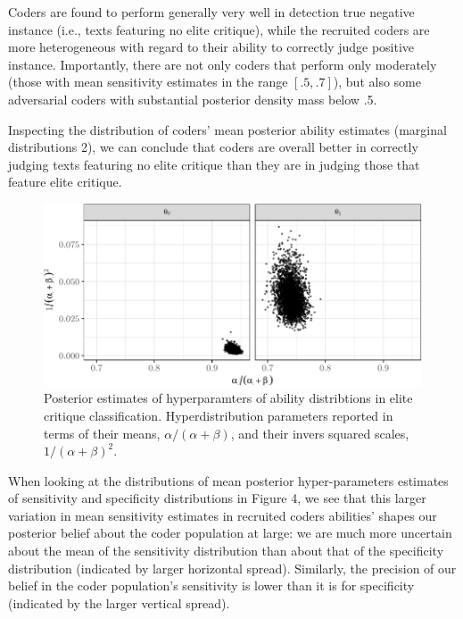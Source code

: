 \documentclass[12pt,]{article}
\begin{document}
Coders are found to perform generally very well in detection true
negative instance (i.e., texts featuring no elite critique), while the
recruited coders are more heterogeneous with regard to their ability to
correctly judge positive instance. Importantly, there are not only
coders that perform only moderately (those with mean sensitivity
estimates in the range \([.5, .7]\)), but also some adversarial coders
with substantial posterior density mass below .5.

Inspecting the distribution of coders' mean posterior ability estimates
(marginal distributions 2), we can conclude that coders are overall
better in correctly judging texts featuring no elite critique than they
are in judging those that feature elite critique.

\begin{figure}[H]

{\centering \includegraphics{licht_2019_evaluating_crowdsourced_elite_critique_codings_files/figure-latex/inspect_hyperpars_anti-elitism-1} 

}

\caption{Posterior estimates of hyperparamters of ability distribtions in elite critique classification. Hyperdistribution parameters reported in terms of their means, $\alpha/(\alpha+\beta)$, and their invers squared scales, $1/(\alpha+\beta)^2$.}\label{fig:inspect_hyperpars_anti-elitism}
\end{figure}

When looking at the distributions of mean posterior hyper-parameters
estimates of sensitivity and specificity distributions in Figure 4, we
see that this larger variation in mean sensitivity estimates in
recruited coders abilities' shapes our posterior belief about the coder
population at large: we are much more uncertain about the mean of the
sensitivity distribution than about that of the specificity distribution
(indicated by larger horizontal spread). Similarly, the precision of our
belief in the coder population's sensitivity is lower than it is for
specificity (indicated by the larger vertical spread).
\end{document}
